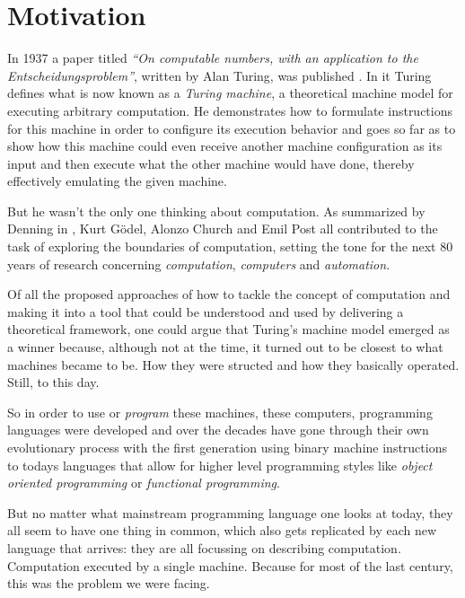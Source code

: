 \section{Motivation}
In 1937 a paper titled \textit{``On computable numbers, with an
application to the Entscheidungsproblem''}, written by Alan Turing, was
published \cite{turingcomputable}. In it Turing defines what is now
known as a \textit{Turing machine}, a theoretical machine model for
executing arbitrary computation. He demonstrates how to formulate
instructions for this machine in order to configure its execution
behavior and goes so far as to show how this
machine could even receive another machine configuration as its input
and then execute what the other machine would have done, thereby
effectively emulating the given machine.
\newline

But he wasn't the only one thinking about computation. As summarized
by Denning in \cite{whatiscomputation}, Kurt Gödel, Alonzo Church and Emil
Post all contributed to the task of exploring the boundaries of
computation, setting the tone for the next 80 years of research
concerning \textit{computation}, \textit{computers} and \textit{automation}.

Of all the proposed approaches of how to tackle the concept of computation
and making it into a tool that could be understood and used by delivering
a theoretical framework, one could argue that Turing's machine model
emerged as a winner because, although not at the time, it turned out
to be closest to what machines became to be. How they were structed and
how they basically operated. Still, to this day.

So in order to use or \textit{program} these machines, these computers,
programming languages were developed and over the decades have gone
through their own evolutionary process \cite{pl-gens} with the
first generation using binary machine instructions to todays languages
that allow for higher level programming styles like
\textit{object oriented programming } or \textit{functional programming}.
\newline

But no matter what mainstream programming language one looks at today,
they all seem to have one thing in common, which also gets replicated
by each new language that arrives: they are all focussing on
describing computation. Computation executed by a single machine.
Because for most of the last century, this was the problem we were
facing.
